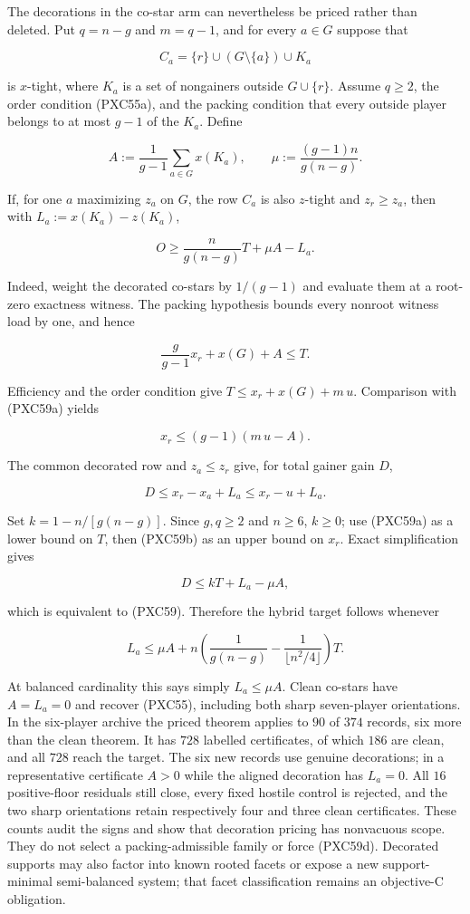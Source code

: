 \documentclass[11pt]{article}
\begin{document}
The decorations in the co-star arm can nevertheless be priced rather than
deleted.  Put $q=n-g$ and $m=q-1$, and for every $a\in G$ suppose that

\[
 C_a=\{r\}\cup(G\setminus\{a\})\cup K_a
\]

is $x$-tight, where $K_a$ is a set of nongainers outside
$G\cup\{r\}$.  Assume $q\ge2$, the order condition (PXC55a), and the
packing condition that every outside player belongs to at most $g-1$ of the
$K_a$.  Define

\[
 A:=\frac1{g-1}\sum_{a\in G}x(K_a),\qquad
 \mu:=\frac{(g-1)n}{g(n-g)}.
\]

If, for one $a$ maximizing $z_a$ on $G$, the row $C_a$ is also $z$-tight
and $z_r\ge z_a$, then with $L_a:=x(K_a)-z(K_a)$,

\[
 \boxed{\qquad
 O\ge \frac{n}{g(n-g)}T+\mu A-L_a .
 \qquad}                                             \tag{PXC59}
\]

Indeed, weight the decorated co-stars by $1/(g-1)$ and evaluate them at a
root-zero exactness witness.  The packing hypothesis bounds every nonroot
witness load by one, and hence

\[
 \frac g{g-1}x_r+x(G)+A\le T.                       \tag{PXC59a}
\]

Efficiency and the order condition give
$T\le x_r+x(G)+m\,u$.  Comparison with (PXC59a) yields

\[
 x_r\le(g-1)(m\,u-A).                               \tag{PXC59b}
\]

The common decorated row and $z_a\le z_r$ give, for total gainer gain $D$,

\[
 D\le x_r-x_a+L_a\le x_r-u+L_a.                    \tag{PXC59c}
\]

Set $k=1-n/[g(n-g)]$.  Since $g,q\ge2$ and $n\ge6$, $k\ge0$; use
(PXC59a) as a lower bound on $T$, then (PXC59b) as an upper bound on $x_r$.
Exact simplification gives

\[
 D\le kT+L_a-\mu A,
\]

which is equivalent to (PXC59).  Therefore the hybrid target follows
whenever

\[
 L_a\le \mu A+
 n\left(\frac1{g(n-g)}-\frac1{\lfloor n^2/4\rfloor}\right)T.      \tag{PXC59d}
\]

At balanced cardinality this says simply $L_a\le\mu A$.  Clean co-stars
have $A=L_a=0$ and recover (PXC55), including both sharp seven-player
orientations.  In the six-player archive the priced theorem applies to $90$
of $374$ records, six more than the clean theorem.  It has $728$ labelled
certificates, of which $186$ are clean, and all $728$ reach the target.  The
six new records use genuine decorations; in a representative certificate
$A>0$ while the aligned decoration has $L_a=0$.  All $16$ positive-floor
residuals still close, every fixed hostile control is rejected, and the two
sharp orientations retain respectively four and three clean certificates.
These counts audit the signs and show that decoration pricing has nonvacuous
scope.  They do not select a packing-admissible family or force (PXC59d).
Decorated supports may also factor into known rooted facets or expose a new
support-minimal semi-balanced system; that facet classification remains an
objective-C obligation.
\end{document}
